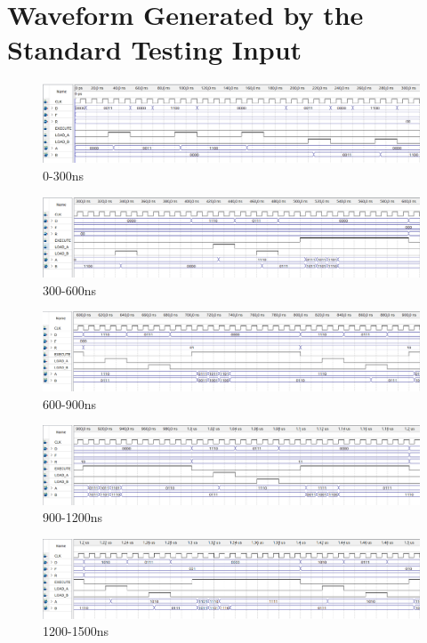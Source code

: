 \documentclass[12pt]{article}
\begin{document}
\section{Waveform Generated by the Standard Testing Input}
\begin{figure}[H]
    \centering
    \includegraphics[width=18cm]{0-300.png}
    \caption{0-300ns}
\end{figure}
\begin{figure}[H]
    \centering
    \includegraphics[width=18cm]{300-600.png}
    \caption{300-600ns}
\end{figure}
\begin{figure}[H]
    \centering
    \includegraphics[width=18cm]{600-900.png}
    \caption{600-900ns}
\end{figure}
\begin{figure}[H]
    \centering
    \includegraphics[width=18cm]{900-1200.png}
    \caption{900-1200ns}
\end{figure}
\begin{figure}[H]
    \centering
    \includegraphics[width=18cm]{1200-1500.png}
    \caption{1200-1500ns}
\end{figure}
\end{document}
